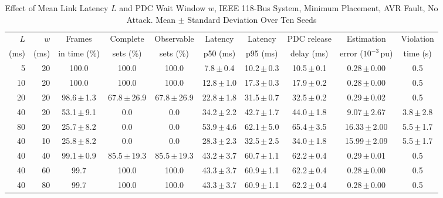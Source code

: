 \begin{table}[t]
\caption{Effect of Mean Link Latency $L$ and PDC Wait Window $w$, IEEE 118-Bus System, Minimum Placement, AVR Fault, No Attack. Mean $\pm$ Standard Deviation Over Ten Seeds}
\label{tab:latency}
\centering
\footnotesize
\begin{tabular}{@{}rrcccccccc@{}}
\toprule
$L$ & $w$ & Frames & Complete & Observable & Latency & Latency & PDC release & Estimation & Violation \\
(ms) & (ms) & in time (\%) & sets (\%) & sets (\%) & p50 (ms) & p95 (ms) & delay (ms) & error ($10^{-3}$\,pu) & time (s) \\
\midrule
5 & 20 & 100.0 & 100.0 & 100.0 & 7.8\,$\pm$\,0.4 & 10.2\,$\pm$\,0.3 & 10.5\,$\pm$\,0.1 & 0.28\,$\pm$\,0.00 & 0.5 \\
10 & 20 & 100.0 & 100.0 & 100.0 & 12.8\,$\pm$\,1.0 & 17.3\,$\pm$\,0.3 & 17.9\,$\pm$\,0.2 & 0.28\,$\pm$\,0.00 & 0.5 \\
20 & 20 & 98.6\,$\pm$\,1.3 & 67.8\,$\pm$\,26.9 & 67.8\,$\pm$\,26.9 & 22.8\,$\pm$\,1.8 & 31.5\,$\pm$\,0.7 & 32.5\,$\pm$\,0.2 & 0.29\,$\pm$\,0.02 & 0.5 \\
40 & 20 & 53.1\,$\pm$\,9.1 & 0.0 & 0.0 & 34.2\,$\pm$\,2.2 & 42.7\,$\pm$\,1.7 & 44.0\,$\pm$\,1.8 & 9.07\,$\pm$\,2.67 & 3.8\,$\pm$\,2.8 \\
80 & 20 & 25.7\,$\pm$\,8.2 & 0.0 & 0.0 & 53.9\,$\pm$\,4.6 & 62.1\,$\pm$\,5.0 & 65.4\,$\pm$\,3.5 & 16.33\,$\pm$\,2.00 & 5.5\,$\pm$\,1.7 \\
\midrule
40 & 10 & 25.8\,$\pm$\,8.2 & 0.0 & 0.0 & 28.3\,$\pm$\,2.3 & 32.5\,$\pm$\,2.5 & 34.0\,$\pm$\,1.8 & 15.99\,$\pm$\,2.09 & 5.5\,$\pm$\,1.7 \\
40 & 40 & 99.1\,$\pm$\,0.9 & 85.5\,$\pm$\,19.3 & 85.5\,$\pm$\,19.3 & 43.2\,$\pm$\,3.7 & 60.7\,$\pm$\,1.1 & 62.2\,$\pm$\,0.4 & 0.29\,$\pm$\,0.01 & 0.5 \\
40 & 60 & 99.7 & 100.0 & 100.0 & 43.3\,$\pm$\,3.7 & 60.9\,$\pm$\,1.1 & 62.2\,$\pm$\,0.4 & 0.28\,$\pm$\,0.00 & 0.5 \\
40 & 80 & 99.7 & 100.0 & 100.0 & 43.3\,$\pm$\,3.7 & 60.9\,$\pm$\,1.1 & 62.2\,$\pm$\,0.4 & 0.28\,$\pm$\,0.00 & 0.5 \\
\bottomrule
\end{tabular}
\end{table}
